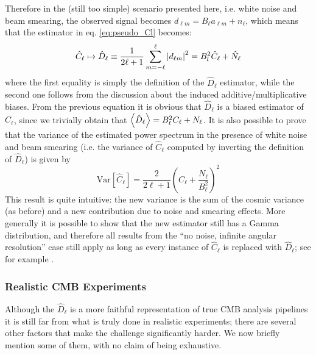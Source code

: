 Therefore in the (still too simple) scenario presented here, i.e. white noise and beam smearing, the observed signal becomes $d_{\ell m} = B_\ell a_{\ell m} + n_\ell$, which means that the estimator in eq. \eqref{eq:pseudo_Cl} becomes:
\begin{equation*}
    \hat{C}_\ell \mapsto \hat{D}_\ell \equiv \frac{1}{2\ell+1} \sum_{m=-\ell}^\ell \abs{d_{\ell m}}^2 = B^2_l \hat{C}_\ell + \hat{N}_\ell
\end{equation*}
where the first equality is simply the definition of the $\hat{D}_\ell$ estimator, while the second one follows from the discussion about the induced additive/multiplicative biases.\cite{likelihood_cmb}
From the previous equation it is obvious that $\hat{D}_\ell$ is a biased estimator of $C_\ell$, since we trivially obtain that $\expval{\hat{D}_\ell} = B^2_\ell C_\ell+N_\ell$.
It is also possible to prove that the variance of the estimated power spectrum in the presence of white noise and beam smearing (i.e. the variance of $\hat{C}_\ell$ computed by inverting the definition of $\hat{D}_\ell$) is given by
\begin{equation*}
    \mathrm{Var}[\hat{C}_\ell] = \frac{2}{2\ell + 1}\left(C_\ell + \frac{N_\ell}{B_\ell^2}\right)^2
\end{equation*}
This result is quite intuitive: the new variance is the sum of the cosmic variance (as before) and a new contribution due to noise and smearing effects.
More generally it is possible to show that the new estimator still has a Gamma distribution, and therefore all results from the ``no noise, infinite angular resolution'' case still apply as long as every instance of $\hat{C}_\ell$ is replaced with $\hat{D}_\ell$; see for example \cite{likelihood_cmb}.

\subsubsection{Realistic CMB Experiments}
Although the $\hat{D}_\ell$ is a more faithful representation of true CMB analysis pipelines it is still far from what is truly done in realistic experiments; there are several other factors that make the challenge significantly harder. We now briefly mention some of them, with no claim of being exhaustive.

